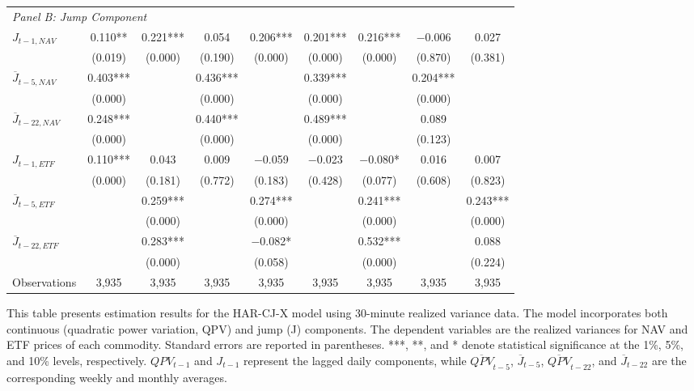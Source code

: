 \begin{landscape}
\begin{table}[htbp]
\begin{threeparttable}
\begin{tabular}{@{}lcccccccc@{}}
\multicolumn{9}{l}{\textit{Panel B: Jump Component}} \\
\addlinespace[0.1cm]
$J_{t-1,NAV}$ & 0.110** & 0.221*** & 0.054 & 0.206*** & 0.201*** & 0.216*** & $-$0.006 & 0.027 \\
              & (0.019) & (0.000) & (0.190) & (0.000) & (0.000) & (0.000) & (0.870) & (0.381) \\
\addlinespace[0.05cm]
$\overline{J}_{t-5,NAV}$ & 0.403*** &  & 0.436*** &  & 0.339*** &  & 0.204*** &  \\
                        & (0.000) &  & (0.000) &  & (0.000) &  & (0.000) &  \\
\addlinespace[0.05cm]
$\overline{J}_{t-22,NAV}$ & 0.248*** &  & 0.440*** &  & 0.489*** &  & 0.089 &  \\
                         & (0.000) &  & (0.000) &  & (0.000) &  & (0.123) &  \\
\addlinespace[0.05cm]
$J_{t-1,ETF}$ & 0.110*** & 0.043 & 0.009 & $-$0.059 & $-$0.023 & $-$0.080* & 0.016 & 0.007 \\
              & (0.000) & (0.181) & (0.772) & (0.183) & (0.428) & (0.077) & (0.608) & (0.823) \\
\addlinespace[0.05cm]
$\overline{J}_{t-5,ETF}$ &  & 0.259*** &  & 0.274*** &  & 0.241*** &  & 0.243*** \\
                        &  & (0.000) &  & (0.000) &  & (0.000) &  & (0.000) \\
\addlinespace[0.05cm]
$\overline{J}_{t-22,ETF}$ &  & 0.283*** &  & $-$0.082* &  & 0.532*** &  & 0.088 \\
                         &  & (0.000) &  & (0.058) &  & (0.000) &  & (0.224) \\
\midrule
Observations & 3,935 & 3,935 & 3,935 & 3,935 & 3,935 & 3,935 & 3,935 & 3,935 \\
\bottomrule
\end{tabular}
\begin{tablenotes}
\small
\item This table presents estimation results for the HAR-CJ-X model using 30-minute realized variance data. The model incorporates both continuous (quadratic power variation, QPV) and jump (J) components. The dependent variables are the realized variances for NAV and ETF prices of each commodity. Standard errors are reported in parentheses. ***, **, and * denote statistical significance at the 1\%, 5\%, and 10\% levels, respectively. $QPV_{t-1}$ and $J_{t-1}$ represent the lagged daily components, while $\overline{QPV}_{t-5}$, $\overline{J}_{t-5}$, $\overline{QPV}_{t-22}$, and $\overline{J}_{t-22}$ are the corresponding weekly and monthly averages.
\end{tablenotes}
\end{threeparttable}
\end{table}
\end{landscape}


